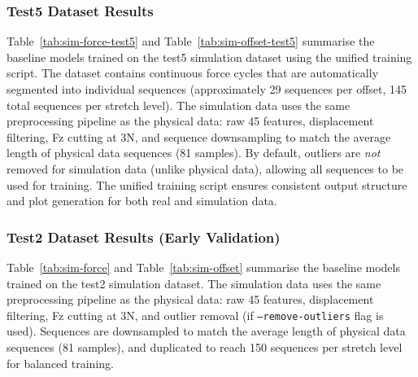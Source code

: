 \documentclass[11pt,a4paper]{article}
\begin{document}
\subsubsection{Test5 Dataset Results}
Table~\ref{tab:sim-force-test5} and Table~\ref{tab:sim-offset-test5} summarise the baseline models trained on the
test5 simulation dataset using the unified training script. The dataset contains continuous force cycles that are automatically segmented into
individual sequences (approximately 29 sequences per offset, 145 total sequences per stretch level).
The simulation data uses the same preprocessing pipeline as the physical data: raw 45 features, displacement filtering,
Fz cutting at 3N, and sequence downsampling to match the average length of physical data sequences (81 samples).
By default, outliers are \emph{not} removed for simulation data (unlike physical data), allowing all sequences to be used for training.
The unified training script ensures consistent output structure and plot generation for both real and simulation data.

\subsubsection{Test2 Dataset Results (Early Validation)}
Table~\ref{tab:sim-force} and Table~\ref{tab:sim-offset} summarise the baseline models trained on the
test2 simulation dataset. The simulation data uses the same preprocessing pipeline as the physical data: raw 45 features,
displacement filtering, Fz cutting at 3N, and outlier removal (if \texttt{--remove-outliers} flag is used). Sequences are downsampled to match the average length of
physical data sequences (81 samples), and duplicated to reach 150 sequences per stretch level for balanced training.
\end{document}
